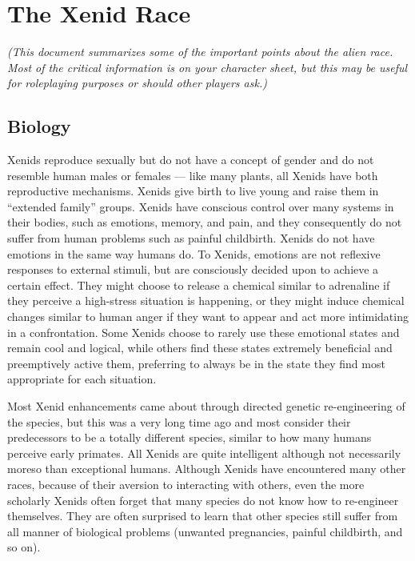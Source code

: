 \documentclass[blue]{guildcamp1}
\begin{document}
\name{\bAlienRace{}}

\section*{The Xenid Race}

\emph{(This document summarizes some of the important points about the alien race. Most of the critical information is on your character sheet, but this may be useful for roleplaying purposes or should other players ask.)}

\subsection*{Biology}

Xenids reproduce sexually but do not have a concept of gender and do not resemble human males or females --- like many plants, all Xenids have both reproductive mechanisms. Xenids give birth to live young and raise them in ``extended family'' groups. Xenids have conscious control over many systems in their bodies, such as emotions, memory, and pain, and they consequently do not suffer from human problems such as painful childbirth. Xenids do not have emotions in the same way humans do. To Xenids, emotions are not reflexive responses to external stimuli, but are consciously decided upon to achieve a certain effect. They might choose to release a chemical similar to adrenaline if they perceive a high-stress situation is happening, or they might induce chemical changes similar to human anger if they want to appear and act more intimidating in a confrontation. Some Xenids choose to rarely use these emotional states and remain cool and logical, while others find these states extremely beneficial and preemptively active them, preferring to always be in the state they find most appropriate for each situation.

Most Xenid enhancements came about through directed genetic re-engineering of the species, but this was a very long time ago and most consider their predecessors to be a totally different species, similar to how many humans perceive early primates. All Xenids are quite intelligent although not necessarily moreso than exceptional humans. Although Xenids have encountered many other races, because of their aversion to interacting with others, even the more scholarly Xenids often forget that many species do not know how to re-engineer themselves. They are often surprised to learn that other species still suffer from all manner of biological problems (unwanted pregnancies, painful childbirth, and so on).
\end{document}
